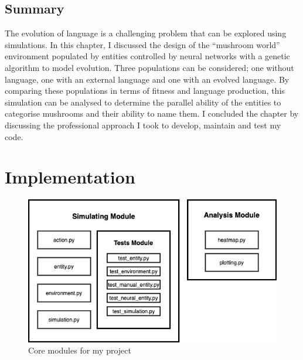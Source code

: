 \documentclass[12pt,a4paper]{report}
\begin{document}
\section{Summary}\label{section:summary}
The evolution of language is a challenging problem that can be explored using simulations. In this chapter, I discussed the design of the ``mushroom world'' environment populated by entities controlled by neural networks with a genetic algorithm to model evolution. Three populations can be considered; one without language, one with an external language and one with an evolved language. By comparing these populations in terms of fitness and language production, this simulation can be analysed to determine the parallel ability of the entities to categorise mushrooms and their ability to name them. I concluded the chapter by discussing the professional approach I took to develop, maintain and test my code.


\chapter{Implementation}


\begin{figure}[t]
  \centering
  \includegraphics[width=.8\linewidth]{figs/modules}
  \caption{Core modules for my project}
  \label{fig:modules}
\end{figure}
\end{document}
